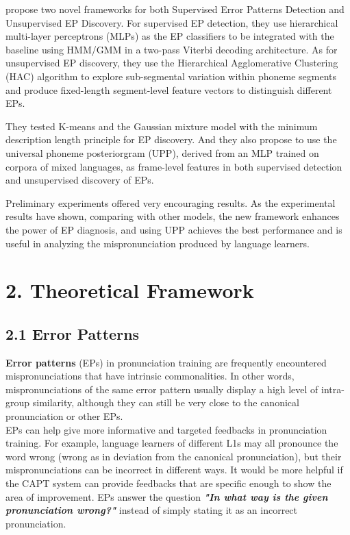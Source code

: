 \documentclass[nobib]{tufte-handout}
\begin{document}
\cite{wang2015supervised} propose two novel frameworks for both Supervised Error Patterns Detection and Unsupervised EP Discovery.  For supervised EP detection,  they use hierarchical multi-layer perceptrons (MLPs) as the EP classifiers to be integrated with the baseline using HMM/GMM in a two-pass Viterbi decoding architecture.  As for unsupervised EP discovery, they use the Hierarchical Agglomerative Clustering (HAC) algorithm to explore sub-segmental variation within phoneme segments and produce fixed-length segment-level feature vectors to distinguish different EPs. 

They tested K-means  and the Gaussian mixture model with the minimum description length principle  for EP discovery.  And they also propose to use the universal phoneme posteriorgram (UPP), derived from an MLP trained on corpora of mixed languages, as frame-level features in both supervised detection and unsupervised discovery of EPs. 

Preliminary experiments offered very encouraging results.  As the experimental results have shown, comparing with other models, the new framework enhances the power of EP diagnosis, and using UPP achieves the best performance and is useful in analyzing the mispronunciation produced by language learners.





\bigskip
\section{2. \textbf{Theoretical Framework}}
\subsection{2.1 \textbf{Error Patterns}}

\textbf{Error patterns} (EPs) in pronunciation training are frequently encountered mispronunciations that have intrinsic commonalities. In other words, mispronunciations of the same error pattern usually display a high level of intra-group similarity, although they can still be very close to the canonical pronunciation or other EPs.\\

EPs can help give more informative and targeted feedbacks in pronunciation training. For example, language learners of different L1s may all pronounce the word wrong (wrong as in deviation from the canonical pronunciation), but their mispronunciations can be incorrect in different ways. It would be more helpful if the CAPT system can provide feedbacks that are specific enough to show the area of improvement. EPs answer the question \textbf{\textit{"In what way is the given pronunciation wrong?"}} instead of simply stating it as an incorrect pronunciation.\\
\end{document}
